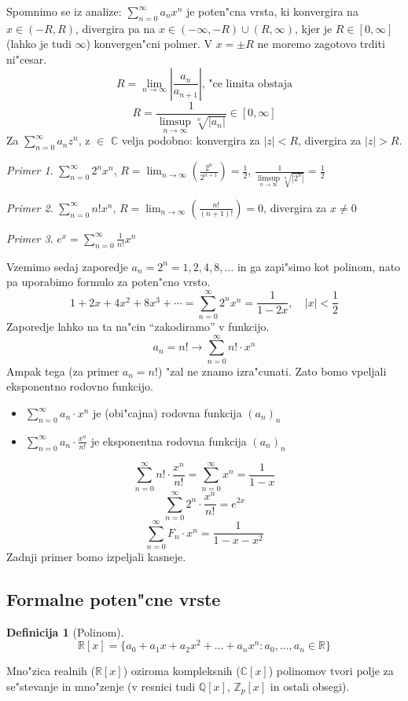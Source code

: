 \documentclass[a4paper,12pt]{article}
\theoremstyle{definition}
\newtheorem{defn}[counter]{Definicija}
\theoremstyle{remark}
\newtheorem*{ex}{Primer}
\newcommand{\Z}{\mathbb{Z}}
\newcommand{\Q}{\mathbb{Q}}
\newcommand{\R}{\mathbb{R}}
\newcommand{\C}{\mathbb{C}}
\begin{document}
\begin{enumerate}
    Spomnimo se iz analize: $\sum_{n = 0}^{\infty} a_n x^n$ je poten"cna vrsta, ki konvergira na $x \in (-R, R)$, divergira pa na $x \in (-\infty, -R) \cup (R, \infty)$, kjer je $R \in [0, \infty]$ (lahko je tudi $\infty$) konvergen"cni polmer. V $x = \pm R$ ne moremo zagotovo trditi ni"cesar.
    \[R = \lim_{n \to \infty} |\frac{a_n}{a_{n + 1}}| \text{, "ce limita obstaja}\]
    \[R = \frac{1}{\limsup\limits_{n \to \infty} \sqrt[n]{|a_n|}} \in [0, \infty]\]
    Za $\sum_{n = 0}^{\infty} a_n z^n$, z $\in$ $\C$ velja podobno: konvergira za $|z| < R$, divergira za $|z| > R$.
    \begin{ex}
    	$\sum_{n = 0}^{\infty} 2^n x^n$, $R = \lim_{n \to \infty} (\frac{2^n}{2^{n + 1}}) = \frac{1}{2}$, $\frac{1}{\limsup\limits_{n \to \infty} \sqrt[n]{|2^n|}} = \frac{1}{2}$
    \end{ex}
    \begin{ex}
    	$\sum_{n = 0}^{\infty} n! x^n$, $R = \lim_{n \to \infty} (\frac{n!}{(n + 1)!}) = 0$, divergira za $x \neq 0$
    \end{ex}
    \begin{ex}
    	$e^x = \sum_{n = 0}^{\infty} \frac{1}{n!} x^n$
    \end{ex}

    Vzemimo sedaj zaporedje $a_n = 2^n = 1, 2, 4, 8, \ldots$ in ga zapi"simo kot polinom, nato pa uporabimo formulo za poten"cno vrsto.
    \[1 + 2x + 4x^2 + 8x^3 + \cdots = \sum_{n=0}^{\infty} 2^n x^n = \frac{1}{1 - 2x}, \quad |x| < \frac{1}{2}\]
    Zaporedje lahko na ta na"cin ``zakodiramo'' v funkcijo.
    \[a_n = n! \rightarrow \sum_{n = 0}^{\infty} n! \cdot x^n\]
    Ampak tega (za primer $a_n = n!$) "zal ne znamo izra"cunati. Zato bomo vpeljali eksponentno rodovno funkcijo.

    \begin{itemize}
        \item $\sum_{n = 0}^{\infty} a_n \cdot x^n$ je (obi"cajna) rodovna funkcija $(a_n)_n$
        \item $\sum_{n = 0}^{\infty} a_n \cdot \frac{x^n}{n!}$ je eksponentna rodovna funkcija $(a_n)_n$
    \end{itemize}
    \[\sum_{n = 0}^{\infty} n! \cdot \frac{x^n}{n!} = \sum_{n = 0}^{\infty} x^n = \frac{1}{1 - x}\]
    \[\sum_{n = 0}^{\infty} 2^n \cdot \frac{x^n}{n!} = e^{2x}\]
    \[\sum_{n = 0}^{\infty} F_n \cdot x^n = \frac{1}{1-x-x^2}\]
    Zadnji primer bomo izpeljali kasneje.
\end{enumerate}

\subsection{Formalne poten"cne vrste}
\begin{defn}[Polinom]
	\[\R [x] = \{a_0 + a_1 x + a_2 x^2 + ... + a_n x^n: a_0, ..., a_n \in \R\}\]
\end{defn}
Mno"zica realnih ($\R[x]$) oziroma kompleksnih ($\C[x]$) polinomov tvori polje za se"stevanje in mno"zenje (v resnici tudi $\Q[x]$, $\Z_p[x]$ in ostali obsegi).
\end{document}
